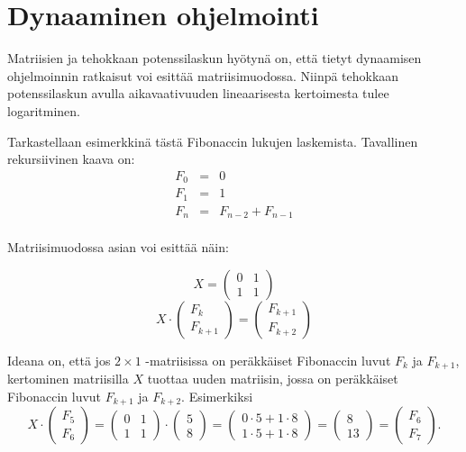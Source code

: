 \section{Dynaaminen ohjelmointi}

Matriisien ja tehokkaan potenssilaskun hyötynä on,
että tietyt dynaamisen ohjelmoinnin ratkaisut
voi esittää matriisimuodossa.
Niinpä tehokkaan potenssilaskun avulla
aikavaativuuden lineaarisesta
kertoimesta tulee logaritminen.

Tarkastellaan esimerkkinä tästä
Fibonaccin lukujen laskemista.
Tavallinen rekursiivinen kaava on:
\[
\begin{array}{lcl}
F_0 & = & 0 \\
F_1 & = & 1 \\
F_n & = & F_{n-2}+F_{n-1} \\
\end{array}
\]

Matriisimuodossa asian voi esittää näin:

\[
X=\left( \begin{array}{cc}
0 & 1 \\
1 & 1 \end{array} \right)
\]
\[
X \cdot
\left( \begin{array}{c}
F_k \\
F_{k+1} \end{array} \right)
=
\left( \begin{array}{c}
F_{k+1} \\
F_{k+2} \end{array} \right)
\]

Ideana on,
että jos $2 \times 1$ -matriisissa
on peräkkäiset Fibonaccin luvut $F_k$ ja $F_{k+1}$,
kertominen matriisilla $X$
tuottaa uuden matriisin,
jossa on peräkkäiset Fibonaccin luvut
$F_{k+1}$ ja $F_{k+2}$. Esimerkiksi
\[
X\cdot
\left( \begin{array}{c}
F_5 \\
F_6 \end{array} \right)
= 
\left( \begin{array}{cc}
0 & 1 \\
1 & 1 \end{array} \right)
\cdot
\left( \begin{array}{c}
5 \\
8 \end{array} \right)
= \left( \begin{array}{c}
0\cdot5+1\cdot8 \\
1\cdot5+1\cdot8 \end{array} \right)
= \left( \begin{array}{c}
8 \\
13 \end{array} \right)
= \left( \begin{array}{c}
F_6 \\
F_7 \end{array} \right).
\]

